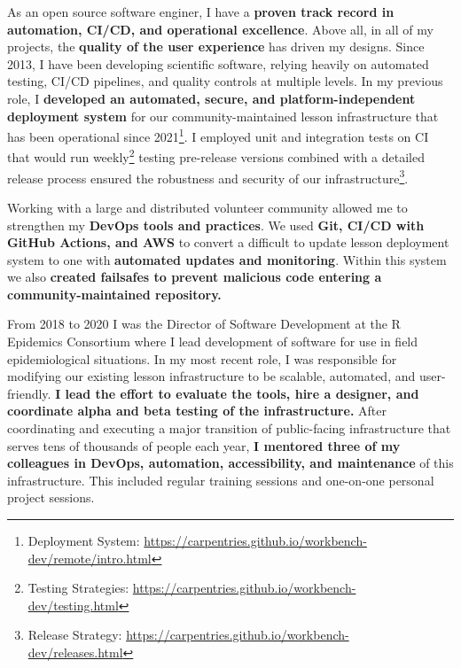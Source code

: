 As an open source software enginer, I have a \textbf{proven track record in automation, CI/CD, and operational excellence}.
Above all, in all of my projects, the \textbf{quality of the user experience} has driven my designs.
Since 2013, I have been developing scientific software, relying heavily on automated testing, CI/CD pipelines, and quality controls at multiple levels.
In my previous role, I \textbf{developed an automated, secure, and platform-independent deployment system} for our community-maintained lesson infrastructure that has been operational since 2021\footnote{Deployment System: \url{https://carpentries.github.io/workbench-dev/remote/intro.html}}. 
I employed unit and integration tests on CI that would run weekly\footnote{Testing Strategies: \url{https://carpentries.github.io/workbench-dev/testing.html}} testing pre-release versions combined with a detailed release process ensured the robustness and security of our infrastructure\footnote{Release Strategy: \url{https://carpentries.github.io/workbench-dev/releases.html}}.

\vspace{2ex}


Working with a large and distributed volunteer community allowed me to strengthen my \textbf{DevOps tools and practices}. 
We used \textbf{Git, CI/CD with GitHub Actions, and AWS} to convert a difficult to update lesson deployment system to one with \textbf{automated updates and monitoring}.
Within this system we also \textbf{created failsafes to prevent malicious code entering a community-maintained repository.} 

\vspace{2ex}


From 2018 to 2020 I was the Director of Software Development at the R Epidemics Consortium where I lead development of software for use in field epidemiological situations. 
In my most recent role, I was responsible for modifying our existing lesson infrastructure to be scalable, automated, and user-friendly.
\textbf{I lead the effort to evaluate the tools, hire a designer, and coordinate alpha and beta testing of the infrastructure.}
After coordinating and executing a major transition of public-facing infrastructure that serves tens of thousands of people each year, \textbf{I mentored
three of my colleagues in DevOps, automation, accessibility, and maintenance} of this infrastructure.
This included regular training sessions and one-on-one personal project sessions.

